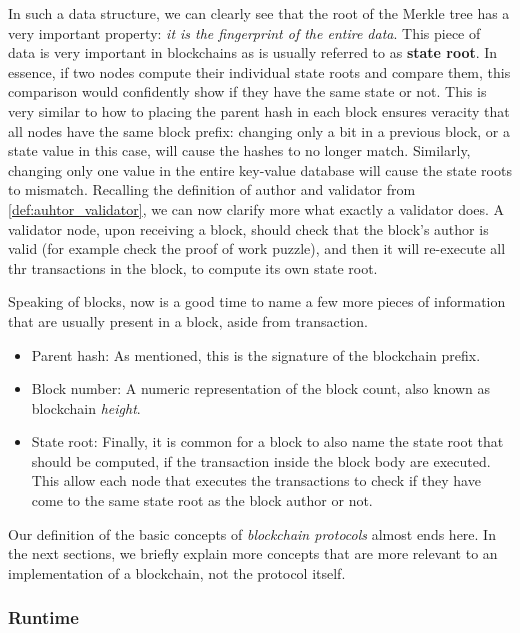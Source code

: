 
In such a data structure, we can clearly see that the root of the Merkle tree has a very important
property: \textit{it is the fingerprint of the entire data}. This piece of data is very important in
blockchains as is usually referred to as \textbf{state root}. In essence, if two nodes compute their
individual state roots and compare them, this comparison would confidently show if they have the
same state or not. This is very similar to how to placing the parent hash in each block ensures
veracity that all nodes have the same block prefix: changing only a bit in a previous block, or a
state value in this case, will cause the hashes to no longer match. Similarly, changing only one
value in the entire key-value database will cause the state roots to mismatch. Recalling the
definition of author and validator from \ref{def:auhtor_validator}, we can now clarify more what
exactly a validator does. A validator node, upon receiving a block, should check that the block's
author is valid (for example check the proof of work puzzle), and then it will re-execute all thr
transactions in the block, to compute its own state root.

Speaking of blocks, now is a good time to name a few more pieces of information that are usually
present in a block, aside from transaction.

\begin{itemize}
	\item Parent hash: As mentioned, this is the signature of the blockchain prefix.
	\item Block number: A numeric representation of the block count, also known as blockchain
	\textit{height}.
	\item State root: Finally, it is common for a block to also name the state root that should be
	computed, if the transaction inside the block body are executed. This allow each node that
	executes the transactions to check if they have come to the same state root as the block author
	or not.
\end{itemize}

Our definition of the basic concepts of \textit{blockchain protocols} almost ends here. In the next
sections, we briefly explain more concepts that are more relevant to an implementation of a
blockchain, not the protocol itself.

\subsubsection{Runtime} \label{chap_bg:subsec:runtime}

